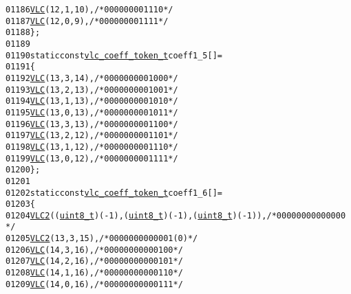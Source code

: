 \begin{footnotesize}
\begin{alltt}
01186         \hyperlink{vlc_8h_a7f3572774a720fd9b4bc3b1a0b65082f}{VLC}(12, 1, 10),   \textcolor{comment}{/* 0000 0000 1110 */}
01187         \hyperlink{vlc_8h_a7f3572774a720fd9b4bc3b1a0b65082f}{VLC}(12, 0, 9),    \textcolor{comment}{/* 0000 0000 1111 */}
01188 \};
01189 
01190 \textcolor{keyword}{static} \textcolor{keyword}{const} \hyperlink{structvlc__coeff__token__t}{vlc_coeff_token_t} coeff1\_5[] = 
01191 \{
01192         \hyperlink{vlc_8h_a7f3572774a720fd9b4bc3b1a0b65082f}{VLC}(13, 3, 14),   \textcolor{comment}{/* 0000 0000 0100 0 */}
01193         \hyperlink{vlc_8h_a7f3572774a720fd9b4bc3b1a0b65082f}{VLC}(13, 2, 13),   \textcolor{comment}{/* 0000 0000 0100 1 */}
01194         \hyperlink{vlc_8h_a7f3572774a720fd9b4bc3b1a0b65082f}{VLC}(13, 1, 13),   \textcolor{comment}{/* 0000 0000 0101 0 */}
01195         \hyperlink{vlc_8h_a7f3572774a720fd9b4bc3b1a0b65082f}{VLC}(13, 0, 13),   \textcolor{comment}{/* 0000 0000 0101 1 */}
01196         \hyperlink{vlc_8h_a7f3572774a720fd9b4bc3b1a0b65082f}{VLC}(13, 3, 13),   \textcolor{comment}{/* 0000 0000 0110 0 */}
01197         \hyperlink{vlc_8h_a7f3572774a720fd9b4bc3b1a0b65082f}{VLC}(13, 2, 12),   \textcolor{comment}{/* 0000 0000 0110 1 */}
01198         \hyperlink{vlc_8h_a7f3572774a720fd9b4bc3b1a0b65082f}{VLC}(13, 1, 12),   \textcolor{comment}{/* 0000 0000 0111 0 */}
01199         \hyperlink{vlc_8h_a7f3572774a720fd9b4bc3b1a0b65082f}{VLC}(13, 0, 12),   \textcolor{comment}{/* 0000 0000 0111 1 */}
01200 \};
01201 
01202 \textcolor{keyword}{static} \textcolor{keyword}{const} \hyperlink{structvlc__coeff__token__t}{vlc_coeff_token_t} coeff1\_6[] = 
01203 \{
01204         \hyperlink{vlc_8h_ad3cda36b9c6132357c7f7de5e52a6c93}{VLC2}((\hyperlink{_types_8h_a363e4d606232036a6b89060813c45489}{uint8_t})(-1), (\hyperlink{_types_8h_a363e4d606232036a6b89060813c45489}{uint8_t})(-1), (\hyperlink{_types_8h_a363e4d606232036a6b89060813c45489}{uint8_t})(-1)),  \textcolor{comment}{/* 0000 0000 0000 00 
      */}
01205         \hyperlink{vlc_8h_ad3cda36b9c6132357c7f7de5e52a6c93}{VLC2}(13, 3, 15),   \textcolor{comment}{/* 0000 0000 0000 1(0) */}
01206         \hyperlink{vlc_8h_a7f3572774a720fd9b4bc3b1a0b65082f}{VLC}(14, 3, 16),   \textcolor{comment}{/* 0000 0000 0001 00 */}
01207         \hyperlink{vlc_8h_a7f3572774a720fd9b4bc3b1a0b65082f}{VLC}(14, 2, 16),   \textcolor{comment}{/* 0000 0000 0001 01 */}
01208         \hyperlink{vlc_8h_a7f3572774a720fd9b4bc3b1a0b65082f}{VLC}(14, 1, 16),   \textcolor{comment}{/* 0000 0000 0001 10 */}
01209         \hyperlink{vlc_8h_a7f3572774a720fd9b4bc3b1a0b65082f}{VLC}(14, 0, 16),   \textcolor{comment}{/* 0000 0000 0001 11 */}

\end{alltt}
\end{footnotesize}
